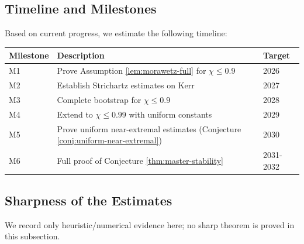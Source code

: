 \documentclass[12pt,a4paper]{article}
\begin{document}
\subsection{Timeline and Milestones}

Based on current progress, we estimate the following timeline:

\begin{center}
\renewcommand{\arraystretch}{1.2}
\begin{tabular}{@{}lp{}l@{}}
\toprule
\textbf{Milestone} & \textbf{Description} & \textbf{Target} \\
\midrule
M1 & Prove Assumption \ref{lem:morawetz-full} for $\chi \leq 0.9$ & 2026 \\
M2 & Establish Strichartz estimates on Kerr & 2027 \\
M3 & Complete bootstrap for $\chi \leq 0.9$ & 2028 \\
M4 & Extend to $\chi \leq 0.99$ with uniform constants & 2029 \\
M5 & Prove uniform near-extremal estimates (Conjecture \ref{conj:uniform-near-extremal}) & 2030 \\
M6 & Full proof of Conjecture \ref{thm:master-stability} & 2031-2032 \\
\bottomrule
\end{tabular}
\end{center}

\subsection{Sharpness of the Estimates}

We record only heuristic/numerical evidence here; no sharp theorem is proved in this subsection.
\end{document}
